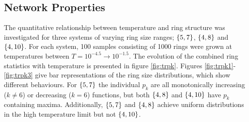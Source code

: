 \subsection{Network Properties}
\label{s:triraftnetprop}

The quantitative relationship between temperature and ring structure was investigated for three systems of varying ring size ranges;  $\left\{5,7\right\}$, $\left\{4,8\right\}$ and $\left\{4,10\right\}$. 
For each system, 100 samples consisting of 1000 rings were grown at temperatures between $T=10^{-4.5}\rightarrow 10^{-1.5}$. 
The evolution of the combined ring statistics with temperature is presented in figure \ref{fig:trpk}. 
Figures \ref{fig:trpk1}\--\ref{fig:trpk3} give bar representations of the ring size distributions, which show different behaviours. 
For $\left\{5,7\right\}$ the individual $p_k$ are all monotonically increasing ($k\neq 6$) or decreasing ($k=6$) functions, but both $\left\{4,8\right\}$ and $\left\{4,10\right\}$ have $p_k$ containing maxima. 
Additionally, $\left\{5,7\right\}$ and $\left\{4,8\right\}$ achieve uniform distributions in the high temperature limit but not $\left\{4,10\right\}$. 


